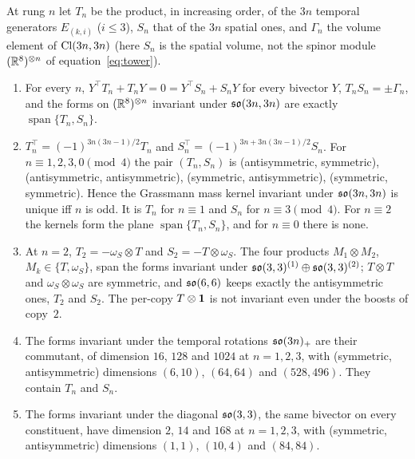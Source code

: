 \begin{theorem}
\label{e6:thm:ladder}
At rung $n$ let $T_n$ be the product, in increasing order, of the $3n$ temporal generators $E_{(k,i)}$ ($i\le3$), $S_n$ that of the $3n$ spatial ones, and
$\Gamma_n$ the volume element of $\mathrm{Cl}(3n,3n)$ (here $S_n$ is the spatial volume, not the spinor module $(\mathbb{R}^8)^{\otimes n}$ of equation~\cref{eq:tower}).
\begin{enumerate}[label=(\roman*),leftmargin=2.2em]
\item For every $n$, $Y^{\!\top}T_n+T_nY=0=Y^{\!\top}S_n+S_nY$ for every bivector $Y$, $T_nS_n=\pm\Gamma_n$, and the forms on $(\mathbb{R}^8)^{\otimes n}$ invariant under
$\mathfrak{so}(3n,3n)$ are exactly $\operatorname{span}\{T_n,S_n\}$.
\item $T_n^{\!\top}=(-1)^{3n(3n-1)/2}T_n$ and $S_n^{\!\top}=(-1)^{3n+3n(3n-1)/2}S_n$. For $n\equiv1,2,3,0\pmod4$ the pair $(T_n,S_n)$ is (antisymmetric,
symmetric), (antisymmetric, antisymmetric), (symmetric, antisymmetric), (symmetric, symmetric). Hence the Grassmann mass kernel invariant under
$\mathfrak{so}(3n,3n)$ is unique iff $n$ is odd. It is $T_n$ for $n\equiv1$ and $S_n$ for $n\equiv3\pmod4$. For $n\equiv2$ the kernels form the plane $\operatorname{span}\{T_n,S_n\}$,
and for $n\equiv0$ there is none.
\item At $n=2$, $T_2=-\omega_S\otimes T$ and $S_2=-T\otimes\omega_S$. The four products $M_1\otimes M_2$, $M_k\in\{T,\omega_S\}$, span the forms invariant under
$\mathfrak{so}(3,3)^{(1)}\oplus\mathfrak{so}(3,3)^{(2)}$; $T\otimes T$ and $\omega_S\otimes\omega_S$ are symmetric, and $\mathfrak{so}(6,6)$ keeps exactly the antisymmetric ones,
$T_2$ and $S_2$. The per-copy $T\otimes\mathbf 1$ is not invariant even under the boosts of copy~$2$.
\item The forms invariant under the temporal rotations $\mathfrak{so}(3n)_+$ are their commutant, of dimension $16$, $128$ and $1024$ at $n=1,2,3$, with
(symmetric, antisymmetric) dimensions $(6,10)$, $(64,64)$ and $(528,496)$. They contain $T_n$ and $S_n$.
\item The forms invariant under the diagonal $\mathfrak{so}(3,3)$, the same bivector on every constituent, have dimension $2$, $14$ and $168$ at $n=1,2,3$, with
(symmetric, antisymmetric) dimensions $(1,1)$, $(10,4)$ and $(84,84)$.
\end{enumerate}
\end{theorem}

